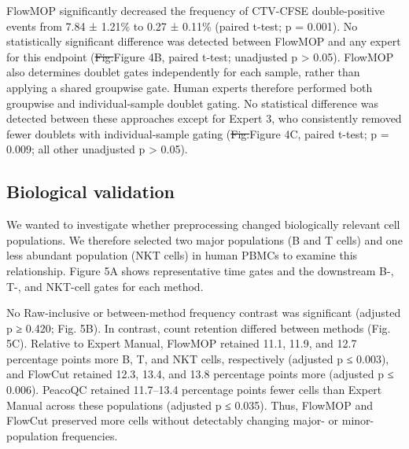 \documentclass[ASNA]{latex/wiley/USG}
\begin{document}
FlowMOP significantly decreased the frequency of CTV-CFSE
double-positive events from 7.84 ± 1.21\% to 0.27 ± 0.11\% (paired
t-test; p = 0.001). No statistically significant difference was detected
between FlowMOP and any expert for this endpoint
({\color{revisionred}\sout{Fig.}}{\color{revisionblue}Figure} 4B, paired
t-test; unadjusted p \textgreater{} 0.05). FlowMOP also determines
doublet gates independently for each sample, rather than applying a
shared groupwise gate. Human experts therefore performed both groupwise
and individual-sample doublet gating. No statistical difference was
detected between these approaches except for Expert 3, who consistently
removed fewer doublets with individual-sample gating
({\color{revisionred}\sout{Fig.}}{\color{revisionblue}Figure} 4C, paired
t-test; p = 0.009; all other unadjusted p \textgreater{} 0.05).

\subsection{Biological validation}\label{biological-validation}

We wanted to investigate whether preprocessing changed biologically
relevant cell populations. We therefore selected two major populations
(B and T cells) and one less abundant population (NKT cells) in human
PBMCs to examine this relationship.{\color{revisionblue} Figure 5A shows
representative time gates and the downstream B-, T-, and NKT-cell gates
for each method.}

No Raw-inclusive or between-method frequency contrast was significant
(adjusted p ≥ 0.420; Fig. 5B). In contrast, count retention differed
between methods (Fig. 5C). Relative to Expert Manual, FlowMOP retained
11.1, 11.9, and 12.7 percentage points more B, T, and NKT cells,
respectively (adjusted p ≤ 0.003), and FlowCut retained 12.3, 13.4, and
13.8 percentage points more (adjusted p ≤ 0.006). PeacoQC retained
11.7--13.4 percentage points fewer cells than Expert Manual across these
populations (adjusted p ≤ 0.035). Thus, FlowMOP and FlowCut preserved
more cells without detectably changing major- or minor-population
frequencies.
\end{document}
